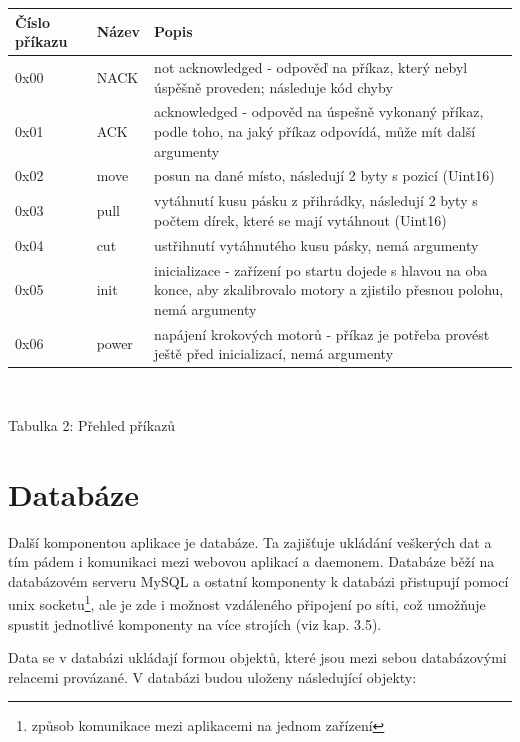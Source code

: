 \documentclass[12pt, a4paper, oneside]{article}
\begin{document}
\begin{center}
\begin{tabular}{| l | l | p{10 cm} |}
\hline
Číslo příkazu & Název & Popis \\ \hline
0x00 & NACK & not acknowledged - odpověď na příkaz, který nebyl úspěšně proveden; následuje kód chyby \\ \hline
0x01 & ACK & acknowledged - odpověd na úspešně vykonaný příkaz, podle toho, na jaký příkaz odpovídá, může mít další argumenty \\ \hline
0x02 & move & posun na dané místo, následují 2 byty s pozicí (Uint16) \\ \hline
0x03 & pull & vytáhnutí kusu pásku z přihrádky, následují 2 byty s počtem dírek, které se mají vytáhnout (Uint16) \\ \hline
0x04 & cut & ustřihnutí vytáhnutého kusu pásky, nemá argumenty \\ \hline
0x05 & init & inicializace - zařízení po startu dojede s hlavou na oba konce, aby zkalibrovalo motory a zjistilo přesnou polohu, nemá argumenty \\ \hline
0x06 & power & napájení krokových motorů - příkaz je potřeba provést ještě před inicializací, nemá argumenty \\ \hline
\end{tabular}
\\
\vspace{1mm}
\caption{Tabulka 2: Přehled příkazů}
\end{center}

\newpage

\section{Databáze}  %

Další komponentou aplikace je databáze. Ta zajišťuje ukládání veškerých dat a tím pádem i komunikaci mezi webovou aplikací a daemonem. Databáze běží na databázovém serveru MySQL a ostatní komponenty k databázi přistupují pomocí unix socketu\footnote{způsob komunikace mezi aplikacemi na jednom zařízení}, ale je zde i možnost vzdáleného připojení po síti, což umožňuje spustit jednotlivé komponenty na více strojích (viz kap. 3.5).

Data se v databázi ukládají formou objektů, které jsou mezi sebou databázovými relacemi provázané. V databázi budou uloženy následující objekty:
\end{document}
